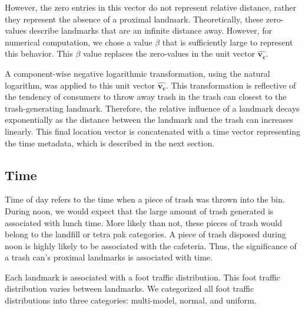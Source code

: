 \documentclass[conference]{ieeeconf}
\newcommand{\uvec}[1]{\boldsymbol{\hat{#1}}}
\begin{document}
However, the zero entries in this vector do not represent relative distance, rather they represent the absence of a proximal landmark. Theoretically, these zero-values describe landmarks that are an infinite distance away. However, for numerical computation, we chose a value $\beta$ that is sufficiently large to represent this behavior. This $\beta$ value replaces the zero-values in the unit vector $\uvec{v_\textbf{c}}$.

A component-wise negative logarithmic transformation, using the natural logarithm, was applied to this unit vector $\uvec{v_\textbf{c}}$. This transformation is reflective of the tendency of consumers to throw away trash in the trash can closest to the trash-generating landmark. Therefore, the relative influence of a landmark decays exponentially as the distance between the landmark and the trash can increases linearly. This final location vector is concatenated with a time vector representing the time metadata, which is described in the next section.

\subsection{Time}


Time of day refers to the time when a piece of trash was thrown into the bin. During noon, we would expect that the large amount of trash generated is associated with lunch time. More likely than not, these pieces of trash would belong to the landfill or tetra pak categories. A piece of trash disposed during noon is highly likely to be associated with the cafeteria. Thus, the significance of a trash can's proximal landmarks is associated with time. 




Each landmark is associated with a foot traffic distribution. This foot traffic distribution varies between landmarks. We categorized all foot traffic distributions into three categories: multi-model, normal, and uniform. 
\end{document}
